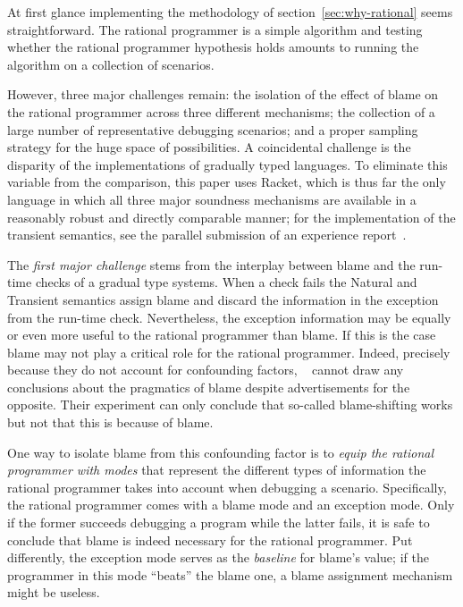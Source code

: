 
At first glance implementing the methodology of
section~\ref{sec:why-rational} seems straightforward. The rational
programmer is a simple algorithm and testing whether the rational
programmer hypothesis holds amounts to running the algorithm on a
collection of scenarios. 

However, three major challenges remain:  the isolation of the effect of
blame on the rational programmer across three different mechanisms; the
collection of a large number of representative debugging scenarios;  and a
proper sampling strategy for the huge space of possibilities. A
coincidental challenge is the disparity of the implementations of
gradually typed languages. To eliminate this variable from the comparison,
this paper uses Racket, which is thus far the only language in which all
three major soundness mechanisms are available in a reasonably robust and
directly comparable manner; for the implementation of the transient
semantics, see the parallel submission of an experience
report~\cite{ttt21}.

The {\em first major challenge\/} stems from the interplay between blame and the
run-time checks of a gradual type systems. When a check fails the Natural
and Transient semantics assign blame and discard  the information in the
exception from the run-time check. Nevertheless, the exception
information may be equally or even more useful to the rational programmer
than blame. If this is the case blame may not play a critical role for the
rational programmer. Indeed, precisely because they do not
account for confounding factors, ~\citet{lksfd-popl-2020} cannot draw any
conclusions about the pragmatics of blame despite advertisements for the
opposite. Their experiment can only conclude that so-called blame-shifting
works but not that this is because of blame. 

One way to isolate blame from this confounding factor is to {\em equip the
rational programmer with modes \/} that represent the different types of
information the rational programmer takes into account when debugging a
scenario. Specifically, the rational programmer comes with a blame mode and
an exception mode. Only if the former succeeds debugging a program while
the latter fails, it is safe to conclude that blame is indeed necessary
for the rational programmer. Put differently, the exception mode serves as
the {\em baseline\/} for blame's value; if the programmer in this mode
``beats'' the  blame one, a blame assignment mechanism might be useless.

